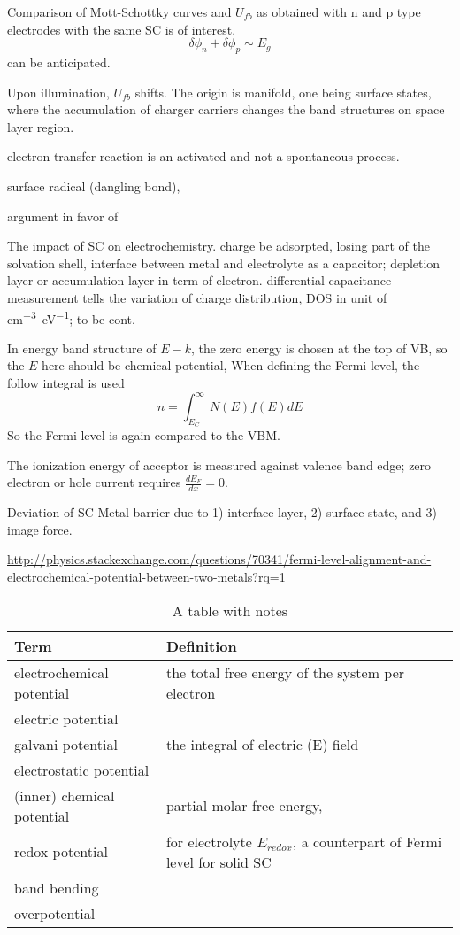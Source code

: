 Comparison of Mott-Schottky curves and $U_{fb}$ as obtained with n and p type electrodes with the same SC is of interest. 
\[
\delta\phi_{n} + \delta\phi_{p} \sim E_g
\]
can be anticipated. 

Upon illumination, $U_{fb}$ shifts. The origin is manifold, one being surface states, where the accumulation of charger carriers changes the band structures on space layer region. 

electron transfer reaction is an activated and not a spontaneous process. 

surface radical (dangling bond), 
 
argument in favor of 


The impact of SC on electrochemistry.\cite{Gerischer1990} charge be adsorpted, losing part of the solvation shell, interface between metal and electrolyte as a capacitor; depletion layer or accumulation layer in term of electron. differential capacitance measurement tells the variation of charge distribution, DOS in unit of \si{cm^{-3}eV^{-1}}; to be cont.


In energy band structure of $E-k$, the zero energy is chosen at the top of VB, so the $E$ here should be chemical potential, \cite{Sze2006} 
When defining the Fermi level, the follow integral is used
\[
n = \int_{E_C}^\infty N(E)f(E)dE
\]
So the Fermi level is again compared to the VBM. 

The ionization energy of acceptor is measured against valence band edge;
zero electron or hole current requires $\frac{dE_F}{dx} = 0$. 

Deviation of SC-Metal barrier due to 1) interface layer, 2) surface state, and 3) image force. 

\url{http://physics.stackexchange.com/questions/70341/fermi-level-alignment-and-electrochemical-potential-between-two-metals?rq=1}

\begin{table}
  \centering
  \caption{A table with notes}  \label{tbl:notes}
  \begin{tabular}{lp{4in}}
    \toprule
    Term      & Definition \\
    \midrule
    electrochemical potential      & the total free energy of the system per electron \\
    electric potential             &  \\
    galvani potential              & the integral of electric (E) field\\
    electrostatic potential        &  \\
    (inner) chemical potential     & partial molar free energy, \\
    redox potential                & for electrolyte $E_{redox}$, a counterpart of Fermi level for solid SC\\
    band bending                   & \\
    overpotential                & \\
    \bottomrule
  \end{tabular}
\end{table}

